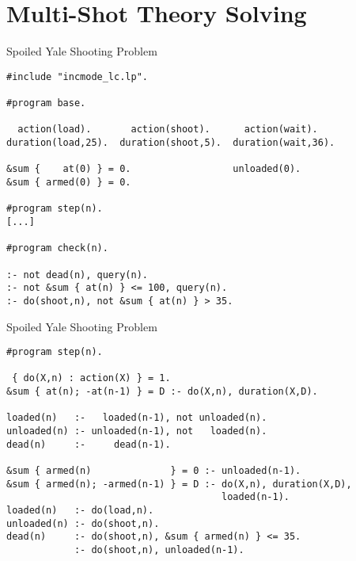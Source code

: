 \documentclass[t,fleqn]{beamer}
\begin{document}
\section{Multi-Shot Theory Solving}
\begin{frame}[fragile,shrink=20]{Spoiled Yale Shooting Problem}
\begin{lstlisting}[linebackgroundcolor={%
      \btLstHL<1>{1-1}%
      \btLstHL<2>{3-9}%
      \btLstHL<3>{11-12}%
      \btLstHL<4>{14-23}%
    }]
#include "incmode_lc.lp".

#program base.

  action(load).       action(shoot).      action(wait).
duration(load,25).  duration(shoot,5).  duration(wait,36).

&sum {    at(0) } = 0.                  unloaded(0).
&sum { armed(0) } = 0.

#program step(n).
[...]

#program check(n).

:- not dead(n), query(n).
:- not &sum { at(n) } <= 100, query(n).
:- do(shoot,n), not &sum { at(n) } > 35.
\end{lstlisting}
\end{frame}
\begin{frame}[fragile,shrink=20]{Spoiled Yale Shooting Problem}
\begin{lstlisting}[linebackgroundcolor={%
      \btLstHL<1>{1-1}%
      \btLstHL<2>{3-4}%
      \btLstHL<3>{6-8}%
      \btLstHL<4>{10-12}%
      \btLstHL<5>{13-16}%
    }]
#program step(n).

 { do(X,n) : action(X) } = 1.
&sum { at(n); -at(n-1) } = D :- do(X,n), duration(X,D).

loaded(n)   :-   loaded(n-1), not unloaded(n).
unloaded(n) :- unloaded(n-1), not   loaded(n).
dead(n)     :-     dead(n-1).

&sum { armed(n)              } = 0 :- unloaded(n-1).
&sum { armed(n); -armed(n-1) } = D :- do(X,n), duration(X,D),
                                      loaded(n-1).
loaded(n)   :- do(load,n).
unloaded(n) :- do(shoot,n).
dead(n)     :- do(shoot,n), &sum { armed(n) } <= 35.
            :- do(shoot,n), unloaded(n-1).
\end{lstlisting}
\end{frame}
\end{document}
